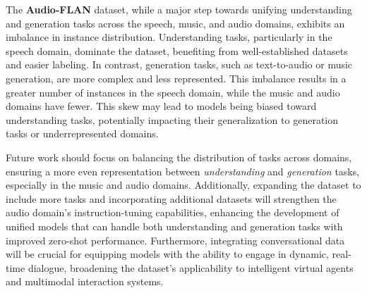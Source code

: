 The \textbf{Audio-FLAN} dataset, while a major step towards unifying understanding and generation tasks across the speech, music, and audio domains, exhibits an imbalance in instance distribution. Understanding tasks, particularly in the speech domain, dominate the dataset, benefiting from well-established datasets and easier labeling. In contrast, generation tasks, such as text-to-audio or music generation, are more complex and less represented. This imbalance results in a greater number of instances in the speech domain, while the music and audio domains have fewer. This skew may lead to models being biased toward understanding tasks, potentially impacting their generalization to generation tasks or underrepresented domains. 




Future work should focus on balancing the distribution of tasks across domains, ensuring a more even representation between \textit{understanding} and \textit{generation} tasks, especially in the music and audio domains. Additionally, expanding the dataset to include more tasks and incorporating additional datasets will strengthen the audio domain’s instruction-tuning capabilities, enhancing the development of unified models that can handle both understanding and generation tasks with improved zero-shot performance. Furthermore, integrating conversational data will be crucial for equipping models with the ability to engage in dynamic, real-time dialogue, broadening the dataset’s applicability to intelligent virtual agents and multimodal interaction systems.